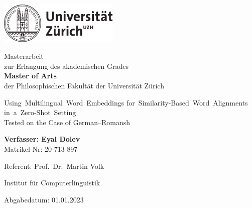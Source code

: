 \begin{titlepage}
\includegraphics[height=20mm]{graphics/uzh_logo_d_pos}\\

\begin{center}

{
Masterarbeit \\
zur Erlangung des akademischen Grades \\
\textbf{Master of Arts} \\
der Philosophischen Fakultät der Universität Zürich \\

\vspace{2cm}

{\Huge \mbox{Using Multilingual Word Embeddings} \mbox{for Similarity-Based Word Alignments} \mbox{in a Zero-Shot Setting}}\\
\vspace{0.5cm}
{\huge Tested on the Case of German--Romansh}\\

\vspace{4cm}

\textbf{Verfasser: Eyal Dolev} \\
	Matrikel-Nr: 20-713-897 \\

\vspace{2cm}

Referent: Prof.~Dr.~Martin Volk


Institut für Computerlinguistik

\vfill Abgabedatum: 01.01.2023

\vspace{3cm}
}
\end{center}

\end{titlepage}

\newpage
